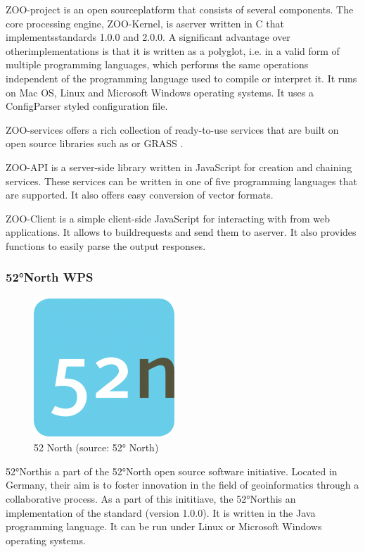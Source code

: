 ZOO-project is an open sourceplatform that consists of several
components. The core processing engine, ZOO-Kernel, is aserver
written in C that implementsstandards 1.0.0 and 2.0.0.\cite{zoo}
A significant advantage over otherimplementations is that it is
written as a polyglot, i.e. in a valid form of multiple programming
languages, which performs the same operations independent of the
programming language used to compile or interpret it.\cite{polyglot}
It runs on Mac OS, Linux and Microsoft Windows operating systems. It
uses a ConfigParser styled configuration file.

ZOO-services offers a rich collection of ready-to-use services that
are built on open source libraries such as  or GRASS .

ZOO-API is a server-side library written in JavaScript for creation
and chaining services. These services can be written in one of five
programming languages that are supported. It also offers easy
conversion of vector formats.

ZOO-Client is a simple client-side JavaScript  for interacting with
 from web applications. It allows to buildrequests and send
them to aserver. \cite{zooclient} It also provides functions to easily parse the
output  responses.


\subsubsection{52°North WPS}
\begin{figure}[H] \centering
      \includegraphics[width=150pt]{./pictures/52n.png}
      \caption[52° North logo]{52 North (source: 52° North)}
      \label{fig:52 North}
  \end{figure}

52°Northis a part of the 52°North open source software
initiative. Located in Germany, their aim is to foster innovation in
the field of geoinformatics through a collaborative process. As a part
of this inititiave, the 52°Northis an implementation of the 
 standard (version 1.0.0). It is written in the Java programming
language. It can be run under Linux or Microsoft Windows operating
systems.

